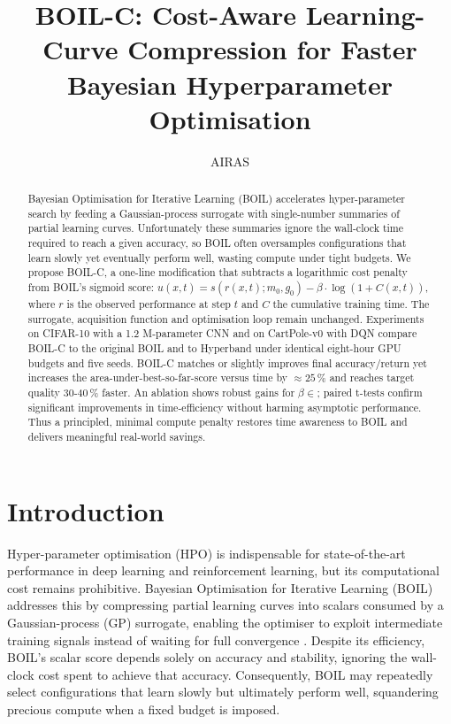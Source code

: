 \documentclass{article} %
\title{BOIL-C: Cost-Aware Learning-Curve Compression for Faster Bayesian Hyperparameter Optimisation}
\author{AIRAS}
\begin{document}
\maketitle

\begin{abstract}
Bayesian Optimisation for Iterative Learning (BOIL) accelerates hyper-parameter search by feeding a Gaussian-process surrogate with single-number summaries of partial learning curves. Unfortunately these summaries ignore the wall-clock time required to reach a given accuracy, so BOIL often oversamples configurations that learn slowly yet eventually perform well, wasting compute under tight budgets. We propose BOIL-C, a one-line modification that subtracts a logarithmic cost penalty from BOIL's sigmoid score: \(u(x,t)=s(r(x,t);m_0,g_0)-\beta\cdot\log(1+C(x,t))\), where \(r\) is the observed performance at step \(t\) and \(C\) the cumulative training time. The surrogate, acquisition function and optimisation loop remain unchanged. Experiments on CIFAR-10 with a 1.2 M-parameter CNN and on CartPole-v0 with DQN compare BOIL-C to the original BOIL and to Hyperband under identical eight-hour GPU budgets and five seeds. BOIL-C matches or slightly improves final accuracy/return yet increases the area-under-best-so-far-score versus time by \(\approx 25\,\%\) and reaches target quality 30-40\,\% faster. An ablation shows robust gains for \(\beta\in\); paired t-tests confirm significant improvements in time-efficiency without harming asymptotic performance. Thus a principled, minimal compute penalty restores time awareness to BOIL and delivers meaningful real-world savings.
\end{abstract}

\section{Introduction}
\label{sec:intro}
Hyper-parameter optimisation (HPO) is indispensable for state-of-the-art performance in deep learning and reinforcement learning, but its computational cost remains prohibitive. Bayesian Optimisation for Iterative Learning (BOIL) addresses this by compressing partial learning curves into scalars consumed by a Gaussian-process (GP) surrogate, enabling the optimiser to exploit intermediate training signals instead of waiting for full convergence \cite{nguyen-2019-bayesian}. Despite its efficiency, BOIL's scalar score depends solely on accuracy and stability, ignoring the wall-clock cost spent to achieve that accuracy. Consequently, BOIL may repeatedly select configurations that learn slowly but ultimately perform well, squandering precious compute when a fixed budget is imposed.
\end{document}
